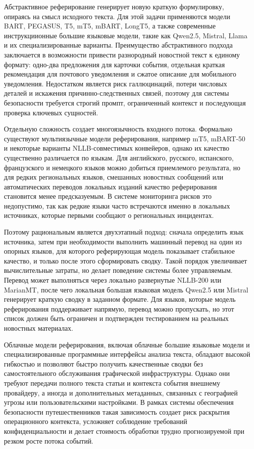 Абстрактивное реферирование генерирует новую краткую формулировку, опираясь на смысл исходного текста. Для этой задачи применяются модели BART, PEGASUS, T5, mT5, mBART, LongT5, а также современные инструкциионные большие языковые модели, такие как Qwen2.5, Mistral, Llama и их специализированные варианты\cite{bart_bib,pegasus_bib,t5_bib,mt5_bib,mbart_bib,longt5_bib,qwen25_bib,mistral7b_bib}. Преимущество абстрактивного подхода заключается в возможности привести разнородный новостной текст к единому формату: одно-два предложения для карточки события, отдельная краткая рекомендация для почтового уведомления и сжатое описание для мобильного уведомления. Недостатком является риск галлюцинаций, потери числовых деталей и искажения причинно-следственных связей, поэтому для системы безопасности требуется строгий промпт, ограниченный контекст и последующая проверка ключевых сущностей.

Отдельную сложность создает многоязычность входного потока. Формально существуют мультиязычные модели реферирования, например mT5, mBART-50 и некоторые варианты NLLB-совместимых конвейеров, однако их качество существенно различается по языкам. Для английского, русского, испанского, французского и немецкого языков можно добиться приемлемого результата, но для редких региональных языков, смешанных новостных сообщений или автоматических переводов локальных изданий качество реферирования становится менее предсказуемым. В системе мониторинга рисков это недопустимо, так как редкие языки часто встречаются именно в локальных источниках, которые первыми сообщают о региональных инцидентах.

Поэтому рациональным является двухэтапный подход: сначала определить язык источника, затем при необходимости выполнить машинный перевод на один из опорных языков, для которого реферирующая модель показывает стабильное качество, и только после этого сформировать сводку. Такой порядок увеличивает вычислительные затраты, но делает поведение системы более управляемым. Перевод может выполняться через локально развернутые NLLB-200 или MarianMT, после чего локальная большая языковая модель Qwen2.5 или Mistral генерирует краткую сводку в заданном формате. Для языков, которые модель реферирования поддерживает напрямую, перевод можно пропускать, но этот список должен быть ограничен и подтвержден тестированием на реальных новостных материалах.

Облачные модели реферирования, включая облачные большие языковые модели и специализированные программные интерфейсы анализа текста, обладают высокой гибкостью и позволяют быстро получить качественные сводки без самостоятельного обслуживания графической инфраструктуры. Однако они требуют передачи полного текста статьи и контекста события внешнему провайдеру, а иногда и дополнительных метаданных, связанных с географией угрозы или пользовательскими настройками. В рамках системы обеспечения безопасности путешественников такая зависимость создает риск раскрытия операционного контекста, усложняет соблюдение требований конфиденциальности и делает стоимость обработки трудно прогнозируемой при резком росте потока событий.

